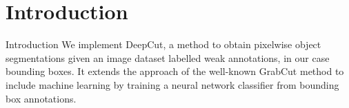\section[Introduction]{Introduction}
\begin{frame}{Introduction}
    We implement DeepCut, a method to obtain pixelwise object segmentations
    given an image dataset labelled weak annotations, in our case bounding
    boxes. It extends the approach of the well-known GrabCut\cite{grabcut} method to
    include machine learning by training a neural network classifier from
    bounding box annotations.

    \nocite{batchnorm}
    \nocite{kaiming}
    \nocite{dropout}
\end{frame}
